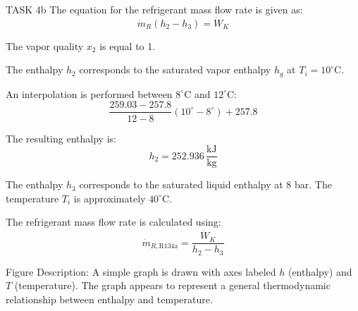 TASK 4b  
The equation for the refrigerant mass flow rate is given as:  
\[
\dot{m}_R (h_2 - h_3) = \dot{W}_K
\]  

The vapor quality \( x_2 \) is equal to 1.  

The enthalpy \( h_2 \) corresponds to the saturated vapor enthalpy \( h_g \) at \( T_i = 10^\circ\text{C} \).  

An interpolation is performed between \( 8^\circ\text{C} \) and \( 12^\circ\text{C} \):  
\[
\frac{259.03 - 257.8}{12 - 8} (10^\circ - 8^\circ) + 257.8
\]  

The resulting enthalpy is:  
\[
h_2 = 252.936 \, \frac{\text{kJ}}{\text{kg}}
\]  

The enthalpy \( h_3 \) corresponds to the saturated liquid enthalpy at 8 bar.  
The temperature \( T_i \) is approximately \( 40^\circ\text{C} \).  

The refrigerant mass flow rate is calculated using:  
\[
\dot{m}_{R,\text{R134a}} = \frac{\dot{W}_K}{h_2 - h_3}
\]  

Figure Description:  
A simple graph is drawn with axes labeled \( h \) (enthalpy) and \( T \) (temperature). The graph appears to represent a general thermodynamic relationship between enthalpy and temperature.  

